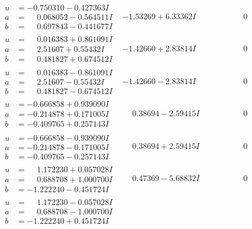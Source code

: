\documentclass[1p]{elsarticle_modified}
\theoremstyle{definition}
\begin{document}
$$\begin{array}{c|c|c}
\begin{aligned}
u &= -0.750310 - 0.427363 I \\
a &= \phantom{-}0.068052 - 0.564511 I \\
b &= \phantom{-}0.697843 - 0.441677 I\end{aligned}
 & -1.53269 + 6.33362 I & \phantom{-0.000000 } 0 \\ \hline\begin{aligned}
u &= \phantom{-}0.016383 + 0.861091 I \\
a &= \phantom{-}2.51607 + 0.55432 I \\
b &= \phantom{-}0.481827 + 0.674512 I\end{aligned}
 & -1.42660 + 2.83814 I & \phantom{-0.000000 } 0 \\ \hline\begin{aligned}
u &= \phantom{-}0.016383 - 0.861091 I \\
a &= \phantom{-}2.51607 - 0.55432 I \\
b &= \phantom{-}0.481827 - 0.674512 I\end{aligned}
 & -1.42660 - 2.83814 I & \phantom{-0.000000 } 0 \\ \hline\begin{aligned}
u &= -0.666858 + 0.939090 I \\
a &= -0.214878 + 0.171005 I \\
b &= -0.409765 + 0.257143 I\end{aligned}
 & \phantom{-}0.38694 - 2.59415 I & \phantom{-0.000000 } 0 \\ \hline\begin{aligned}
u &= -0.666858 - 0.939090 I \\
a &= -0.214878 - 0.171005 I \\
b &= -0.409765 - 0.257143 I\end{aligned}
 & \phantom{-}0.38694 + 2.59415 I & \phantom{-0.000000 } 0 \\ \hline\begin{aligned}
u &= \phantom{-}1.172230 + 0.057028 I \\
a &= \phantom{-}0.688708 + 1.000700 I \\
b &= -1.222240 - 0.451724 I\end{aligned}
 & \phantom{-}0.47369 - 5.68832 I & \phantom{-0.000000 } 0 \\ \hline\begin{aligned}
u &= \phantom{-}1.172230 - 0.057028 I \\
a &= \phantom{-}0.688708 - 1.000700 I \\
b &= -1.222240 + 0.451724 I\end{aligned}

\end{array}$$
\end{document}
